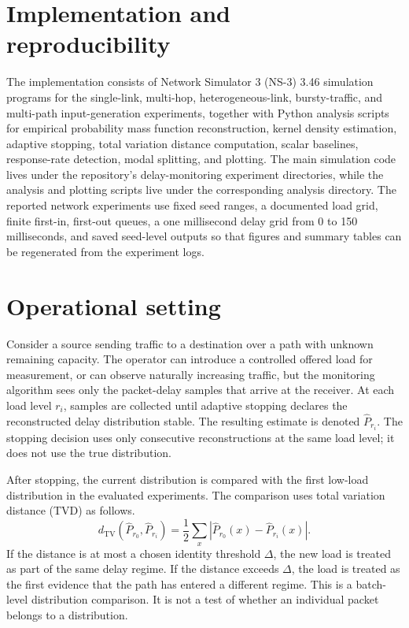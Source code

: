 \section{Implementation and reproducibility}

The implementation consists of Network Simulator 3 (NS-3) 3.46 simulation programs for the single-link, multi-hop, heterogeneous-link, bursty-traffic, and multi-path input-generation experiments, together with Python analysis scripts for empirical probability mass function reconstruction, kernel density estimation, adaptive stopping, total variation distance computation, scalar baselines, response-rate detection, modal splitting, and plotting. The main simulation code lives under the repository's delay-monitoring experiment directories, while the analysis and plotting scripts live under the corresponding analysis directory. The reported network experiments use fixed seed ranges, a documented load grid, finite first-in, first-out queues, a one millisecond delay grid from 0 to 150 milliseconds, and saved seed-level outputs so that figures and summary tables can be regenerated from the experiment logs.

\section{Operational setting}

Consider a source sending traffic to a destination over a path with unknown remaining capacity. The operator can introduce a controlled offered load for measurement, or can observe naturally increasing traffic, but the monitoring algorithm sees only the packet-delay samples that arrive at the receiver. At each load level \(r_i\), samples are collected until adaptive stopping declares the reconstructed delay distribution stable. The resulting estimate is denoted \(\widehat{P}_{r_i}\). The stopping decision uses only consecutive reconstructions at the same load level; it does not use the true distribution.

After stopping, the current distribution is compared with the first low-load distribution in the evaluated experiments. The comparison uses total variation distance (TVD) as follows.
\[
d_{\mathrm{TV}}\left(\widehat{P}_{r_0},\widehat{P}_{r_i}\right)
= \frac{1}{2}\sum_x
\left|\widehat{P}_{r_0}(x)-\widehat{P}_{r_i}(x)\right|.
\]
If the distance is at most a chosen identity threshold \(\Delta\), the new load is treated as part of the same delay regime. If the distance exceeds \(\Delta\), the load is treated as the first evidence that the path has entered a different regime. This is a batch-level distribution comparison. It is not a test of whether an individual packet belongs to a distribution.

